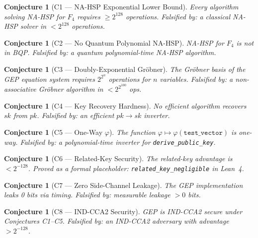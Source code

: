 \documentclass[11pt,letterpaper]{article}
\newtheorem{conjecture}[theorem]{Conjecture}
\theoremstyle{definition}
\begin{document}
\begin{conjecture}[C1 — NA-HSP Exponential Lower Bound]
Every algorithm solving NA-HSP for $F_4$ requires $\geq 2^{128}$ operations.
\textit{Falsified by}: a classical NA-HSP solver in $< 2^{128}$ operations.
\end{conjecture}

\begin{conjecture}[C2 — No Quantum Polynomial NA-HSP]
NA-HSP for $F_4$ is not in BQP.
\textit{Falsified by}: a quantum polynomial-time NA-HSP algorithm.
\end{conjecture}

\begin{conjecture}[C3 — Doubly-Exponential Gr\"obner]
The Gr\"obner basis of the GEP equation system requires $2^{2^{n}}$ operations
for $n$ variables.
\textit{Falsified by}: a non-associative Gr\"obner algorithm in $< 2^{2^{100}}$ ops.
\end{conjecture}

\begin{conjecture}[C4 — Key Recovery Hardness]
No efficient algorithm recovers $sk$ from $pk$.
\textit{Falsified by}: an efficient $pk \to sk$ inverter.
\end{conjecture}

\begin{conjecture}[C5 — One-Way $\varphi$]
The function $\varphi \mapsto \varphi(\mathtt{test\_vector})$ is one-way.
\textit{Falsified by}: a polynomial-time inverter for \texttt{derive\_public\_key}.
\end{conjecture}

\begin{conjecture}[C6 — Related-Key Security]
The related-key advantage is $< 2^{-128}$.
\textit{Proved as a formal placeholder}: \texttt{related\_key\_negligible}
in Lean~4.
\end{conjecture}

\begin{conjecture}[C7 — Zero Side-Channel Leakage]
The GEP implementation leaks 0 bits via timing.
\textit{Falsified by}: measurable leakage $> 0$ bits.
\end{conjecture}

\begin{conjecture}[C8 — IND-CCA2 Security]
GEP is IND-CCA2 secure under Conjectures C1--C5.
\textit{Falsified by}: an IND-CCA2 adversary with advantage $> 2^{-128}$.
\end{conjecture}

\end{document}
